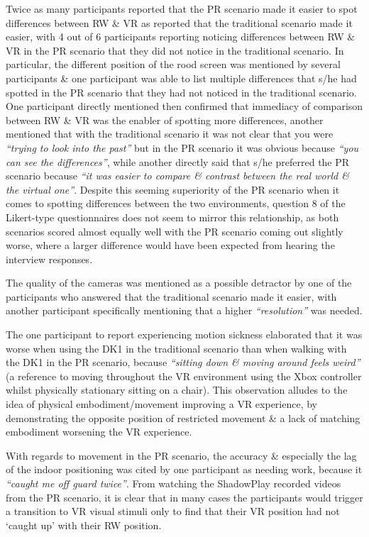 Twice as many participants reported that the PR scenario made it easier to spot differences between RW \& VR as reported that the traditional scenario made it easier, with 4 out of 6 participants reporting noticing differences between RW \& VR in the PR scenario that they did not notice in the traditional scenario. In particular, the different position of the rood screen was mentioned by several participants \& one participant was able to list multiple differences that s/he had spotted in the PR scenario that they had not noticed in the traditional scenario. One participant directly mentioned then confirmed that immediacy of comparison between RW \& VR was the enabler of spotting more differences, another mentioned that with the traditional scenario it was not clear that you were \textit{``trying to look into the past''} but in the PR scenario it was obvious because \textit{``you can see the differences''}, while another directly said that s/he preferred the PR scenario because \textit{``it was easier to compare \& contrast between the real world \& the virtual one''}. Despite this seeming superiority of the PR scenario when it comes to spotting differences between the two environments, question 8 of the Likert-type questionnaires does not seem to mirror this relationship, as both scenarios scored almost equally well with the PR scenario coming out slightly worse, where a larger difference would have been expected from hearing the interview responses.

The quality of the cameras was mentioned as a possible detractor by one of the participants who answered that the traditional scenario made it easier, with another participant specifically mentioning that a higher \textit{``resolution''} was needed.

The one participant to report experiencing motion sickness elaborated that it was worse when using the DK1 in the traditional scenario than when walking with the DK1 in the PR scenario, because \textit{``sitting down \& moving around feels weird''} (a reference to moving throughout the VR environment using the Xbox controller whilst physically stationary sitting on a chair). This observation alludes to the idea of physical embodiment/movement improving a VR experience, by demonstrating the opposite position of restricted movement \& a lack of matching embodiment worsening the VR experience.

With regards to movement in the PR scenario, the accuracy \& especially the lag of the indoor positioning was cited by one participant as needing work, because it \textit{``caught me off guard twice''}. From watching the ShadowPlay recorded videos from the PR scenario, it is clear that in many cases the participants would trigger a transition to VR visual stimuli only to find that their VR position had not `caught up' with their RW position.

